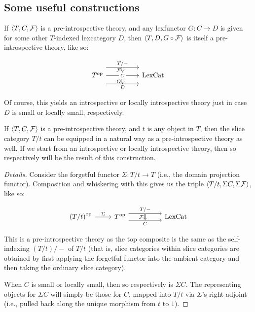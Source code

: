 \subsection{Some useful constructions}
\begin{construction}\label{IntrospInternalMap}
If $\langle T, C, \mathcal{F} \rangle$ is a pre-introspective theory, and any lexfunctor $G : C \to D$ is given for some other $T$-indexed lexcategory $D$, then $\langle T, D, G \circ \mathcal{F} \rangle$ is itself a pre-introspective theory, like so: 

\[\begin{tikzcd}
	{\op{T}} && {\LexCat}
	\arrow["{T/-}"{name=0}, from=1-1, to=1-3, shift left=5]
	\arrow["{C}"{name=1, description}, from=1-1, to=1-3]
	\arrow["{D}"{name=2, swap}, from=1-1, to=1-3, shift right=5]
	\arrow[Rightarrow, "{\introF}"', from=0, to=1]
	\arrow[Rightarrow, "{G}"', from=1, to=2]
\end{tikzcd}\]

Of course, this yields an introspective or locally introspective theory just in case $D$ is small or locally small, respectively.
\end{construction}

\begin{construction}\label{IntrospSlice}
If $\langle T, C, \mathcal{F} \rangle$ is a pre-introspective theory, and $t$ is any object in $T$, then the slice category $T/t$ can be equipped in a natural way as a pre-introspective theory as well. If we start from an introspective or locally introspective theory, then so respectively will be the result of this construction.
\end{construction}
\begin{proof}[Details]
Consider the forgetful functor $\Sigma : T/t \to T$ (i.e., the domain projection functor). Composition and whiskering with this gives us the triple $\langle T/t, \Sigma C, \Sigma \mathcal{F} \rangle$, like so:

\[\begin{tikzcd}
	{\op{\left(T/t\right)}} & {\op{T}} && {\LexCat}
	\arrow["{T/-}"{name=0}, from=1-2, to=1-4, shift left=2]
	\arrow["{C}"{name=1, swap}, from=1-2, to=1-4, shift right=2]
	\arrow["{\Sigma}", from=1-1, to=1-2]
	\arrow[Rightarrow, "{\introF}"', from=0, to=1]
\end{tikzcd}\]

This is a pre-introspective theory as the top composite is the same as the self-indexing $(T/t)/-$ of $T/t$ (that is, slice categories within slice categories are obtained by first applying the forgetful functor into the ambient category and then taking the ordinary slice category).

When $C$ is small or locally small, then so respectively is $\Sigma C$. The representing objects for $\Sigma C$ will simply be those for $C$, mapped into $T/t$ via $\Sigma$'s right adjoint (i.e., pulled back along the unique morphism from $t$ to $1$).
\end{proof}

